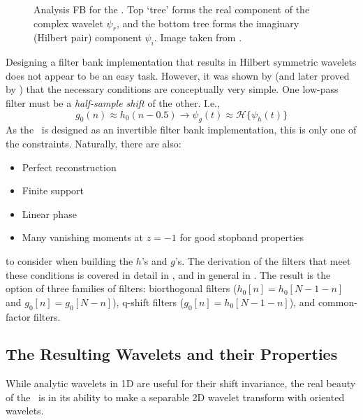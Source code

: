   \begin{figure}
    \centering
      \caption[Analysis FB for the \DTCWT]
              {Analysis FB for the \DTCWT\@. Top `tree' forms the real
              component of the complex wavelet $\psi_r$, and the bottom tree forms the
              imaginary (Hilbert pair) component $\psi_i$. Image taken from
              \citep{selesnick_dual-tree_2005}.}
      \label{fig:dtcwt_1d_fb}
  \end{figure}

  Designing a filter bank implementation that results in Hilbert symmetric
  wavelets does not appear to be an easy task. However, it was shown
  by \citet{kingsbury_image_1999} (and later proved by
  \citet{selesnick_hilbert_2001}) that the necessary conditions are
  conceptually very simple. One low-pass filter must be a \emph{half-sample shift} of
  the other. I.e.,\ 
  \begin{equation}
    g_0(n) \approx h_0(n-0.5) \rightarrow \psi_g(t) \approx
    \mathcal{H}\{\psi_h(t)\}
  \end{equation}
  As the \DTCWT\ is designed as an invertible filter bank implementation, this
  is only one of the constraints. Naturally, there are also:
  \begin{itemize}
    \item Perfect reconstruction
    \item Finite support
    \item Linear phase
    \item Many vanishing moments at $z=-1$ for good stopband properties
  \end{itemize}
  to consider when building the $h$'s and $g$'s.
  The derivation of the filters that meet these conditions is covered in
  detail in \citep{kingsbury_complex_2001, kingsbury_design_2003}, and in
  general in \citep{selesnick_dual-tree_2005}. The result is the
  option of three families of filters:  biorthogonal filters ($h_0[n] =
  h_0[N-1-n]$ and $g_0[n] = g_0[N-n]$), q-shift filters ($g_0[n]
  = h_0[N-1-n]$), and common-factor filters.

\subsection{The Resulting Wavelets and their Properties}
  While analytic wavelets in 1D are useful for their shift invariance, the real
  beauty of the \DTCWT\ is in its ability to make a separable 2D wavelet
  transform with oriented wavelets. 
  
